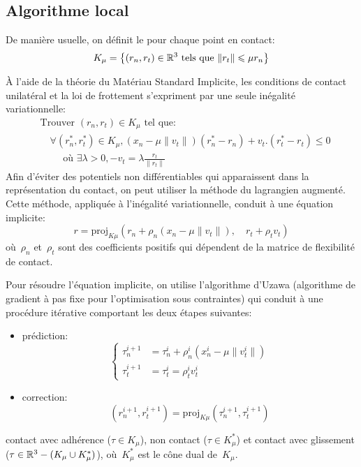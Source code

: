 \medskip
\subsection{Algorithme local}

De manière usuelle, on définit le  pour chaque point
en contact:
\begin{equation} K_\mu = \left\{ (r_n, r_t) \in \mathbb R^3 \text{ tels que } \|r_t\| \leqslant \mu r_n \right\} \end{equation}

À l'aide de la théorie du Matériau Standard Implicite, les conditions de contact unilatéral et la loi de frottement s'expriment par une seule inégalité variationnelle:
\begin{equation}
\begin{aligned}
&\text{Trouver } (r_n, r_t) \in K_\mu \text{ tel que: }\\
&\quad\forall (r_n^*, r_t^*) \in K_\mu, (x_n - \mu \|v_t\|) (r_n^* - r_n) + v_t.(r_t^* - r_t) \le 0\\
&\quad\quad\text{ où } \exists\lambda>0, - v_t = \lambda \frac{r_t}{\|r_t\|}
\end{aligned}
\end{equation}
\medskipvm
Afin d'éviter des potentiels non différentiables qui apparaissent dans la représentation du contact, on peut utiliser la méthode du lagrangien augmenté. Cette méthode, appliquée à l'inégalité variationnelle, conduit à une équation implicite:
\begin{equation} r = \mathrm{proj}_{K\mu} (r_n + \rho_n(x_n - \mu \|v_t\|), \quad r_t + \rho_t v_t) \end{equation}
où~$\rho_n$ et~$\rho_t$ sont des coefficients positifs qui dépendent de la matrice de flexibilité de contact.

Pour résoudre l'équation implicite, on utilise l'algorithme d'Uzawa (algorithme de gradient à pas fixe pour l'optimisation sous contraintes) qui conduit à une procédure itérative comportant les deux étapes suivantes:
\begin{itemize}
  \item prédiction:
  \begin{equation}\left\{\begin{aligned}
	\tau_n^{i+1}&=\tau_n^i+\rho_n^i(x_n^i-\mu\|v_t^i\|)\\
	\tau_t^{i+1}&=\tau_t^i=\rho_t^iv_t^i
	\end{aligned}\right.\end{equation}
  \item correction:
  \begin{equation}(r_n^{i+1},r_t^{i+1}) = \mathrm{proj}_{K\mu}(\tau_ n^{i+1}, \tau_t^{i+1})\end{equation}
\end{itemize}
contact avec adhérence ($\tau\in K_\mu$), non contact ($\tau\in K_\mu^*$) et contact avec glissement ($\tau\in\mathbb R^3- (K_\mu \cup K_\mu^*)$), où~$K_\mu^*$ est le cône dual de~$K_\mu$.

